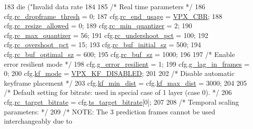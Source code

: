 \begin{DoxyCodeInclude}
{{{{{{{{{{{{{{183             die (\textcolor{stringliteral}{"Invalid data rate %
184 
185     \textcolor{comment}{/* Real time parameters */}
186     cfg.\hyperlink{structvpx__codec__enc__cfg_a619269f9a6904de58c4790e6806a3905}{rc\_dropframe\_thresh} = 0;
187     cfg.\hyperlink{structvpx__codec__enc__cfg_a99c415edb6c6f909a095a57c3430a116}{rc\_end\_usage}        = \hyperlink{group__encoder_ggaf50e74d91be4cae6f70dfeba5b7410d2a8b02853cb35790d60cc171a11f6c268a}{VPX\_CBR};
188     cfg.\hyperlink{structvpx__codec__enc__cfg_a02a4e2f18fb0fdfff44df8b0d9a99d6c}{rc\_resize\_allowed}   = 0;
189     cfg.\hyperlink{structvpx__codec__enc__cfg_a1324600e3c63faaa7717e85cf6509dd9}{rc\_min\_quantizer}    = 2;
190     cfg.\hyperlink{structvpx__codec__enc__cfg_a8abdd985d317b720e142335887d737df}{rc\_max\_quantizer}    = 56;
191     cfg.\hyperlink{structvpx__codec__enc__cfg_ad279fbb0a9fe9395340913161e28651a}{rc\_undershoot\_pct}   = 100;
192     cfg.\hyperlink{structvpx__codec__enc__cfg_a4f2fbd015c1b1f395cc4a4b03d4ead5f}{rc\_overshoot\_pct}    = 15;
193     cfg.\hyperlink{structvpx__codec__enc__cfg_aa9e4d6405994ef42d61d478cf6e0d5e0}{rc\_buf\_initial\_sz}   = 500;
194     cfg.\hyperlink{structvpx__codec__enc__cfg_aafde485867e040a58504ad796e79e47f}{rc\_buf\_optimal\_sz}   = 600;
195     cfg.\hyperlink{structvpx__codec__enc__cfg_a61866272bb588cd86d28834f420430f0}{rc\_buf\_sz}           = 1000;
196 
197     \textcolor{comment}{/* Enable error resilient mode */}
198     cfg.\hyperlink{structvpx__codec__enc__cfg_a4e17173b66ca0d7dfba9978625d7ba76}{g\_error\_resilient} = 1;
199     cfg.\hyperlink{structvpx__codec__enc__cfg_a992668d9e30305f3f7ab2672ea31a890}{g\_lag\_in\_frames}   = 0;
200     cfg.\hyperlink{structvpx__codec__enc__cfg_a491d67f061dcdb13f60c017563e9d788}{kf\_mode}           = \hyperlink{group__encoder_gga9f461802aa4db35c04a8b23837987f40a56513f60cbf3434ca0092173005d0ab2}{VPX\_KF\_DISABLED};
201 
202     \textcolor{comment}{/* Disable automatic keyframe placement */}
203     cfg.\hyperlink{structvpx__codec__enc__cfg_a0a7b5444ecb09745cbe8d5af17553846}{kf\_min\_dist} = cfg.\hyperlink{structvpx__codec__enc__cfg_ae018440136e271743376730413d25a9b}{kf\_max\_dist} = 3000;
204 
205     \textcolor{comment}{/* Default setting for bitrate: used in special case of 1 layer (case 0). */}
206     cfg.\hyperlink{structvpx__codec__enc__cfg_ab8339685175d66710f482706cc9f0aed}{rc\_target\_bitrate} = cfg.\hyperlink{structvpx__codec__enc__cfg_aba7ceb7a90500a8f76aff89575737f3a}{ts\_target\_bitrate}[0];
207 
208     \textcolor{comment}{/* Temporal scaling parameters: */}
209     \textcolor{comment}{/* NOTE: The 3 prediction frames cannot be used interchangeably due to}
}}}}}}}}}}}}}}}
\end{DoxyCodeInclude}
